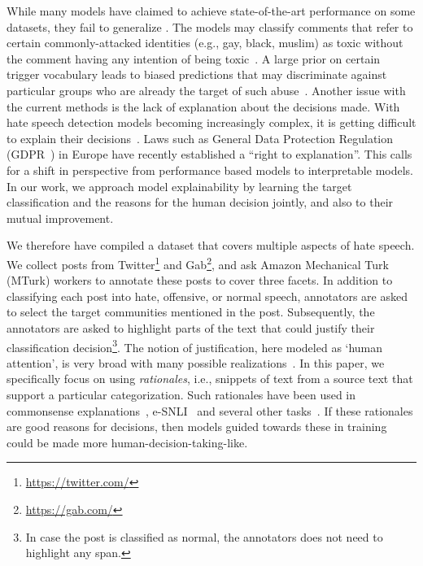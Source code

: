 \documentclass[letterpaper]{article} \usepackage{aaai21}  \usepackage{times}  \usepackage{helvet} \usepackage{courier}  \usepackage[hyphens]{url}  \usepackage{graphicx} \urlstyle{rm} \def\UrlFont{\rm}  \usepackage{natbib}  \usepackage{caption}
\begin{document}
While many models have claimed to achieve state-of-the-art performance on some datasets, they fail to generalize \cite{arango2019hate,grondahl2018all}. The models may classify comments that refer to certain commonly-attacked identities (e.g., gay, black, muslim)  as  toxic  without  the  comment  having  any  intention of being toxic~\cite{dixon2018measuring,borkan2019nuanced}.
 A large prior on certain trigger vocabulary leads to biased predictions that may discriminate against particular groups who are already the target of such abuse~\cite{sap2019risk,davidson2019racial}. Another issue with the current methods is the lack of explanation about the decisions made. With hate speech detection models becoming increasingly complex, it is getting difficult to explain their decisions~\cite{bengio2017deep}.
Laws such as General Data Protection Regulation (GDPR~\cite{EU_GDPR_2016}) in Europe have recently established a ``right to explanation''. This calls for a shift in perspective from performance based models to interpretable models. 
In our work, we approach model explainability by learning the target classification and the reasons for the human decision jointly, and also to their mutual improvement. 



We therefore have compiled a dataset that covers multiple aspects of hate speech. We collect posts from Twitter\footnote{\url{https://twitter.com/}} and Gab\footnote{\url{https://gab.com/}}, and ask Amazon Mechanical Turk (MTurk) workers to annotate these posts to cover three facets. In addition to classifying each post into hate, offensive, or normal speech, annotators are asked to select the target communities mentioned in the post. Subsequently, the annotators are asked to highlight parts of the text that could justify their classification decision\footnote{In case the post is classified as normal, the annotators does not need to highlight any span.}. The notion of justification, here modeled as `human attention', is very broad with many possible realizations~\cite{lipton2016mythos,doshi2017towards}. In this paper, we specifically focus on using \textit{rationales}, i.e., snippets of text from a source text that support a particular categorization. Such rationales have been used in commonsense explanations~\cite{rajani-etal-2019-explain}, e-SNLI~\cite{camburu2018snli} and several other tasks~\cite{deyoung2019eraser}. If these rationales are good reasons for decisions, then models guided towards these in training could be made more human-decision-taking-like. 
\end{document}
